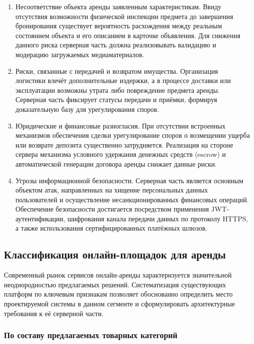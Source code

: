\begin{enumerate}
    \item Несоответствие объекта аренды заявленным характеристикам. Ввиду отсутствия возможности физической инспекции предмета до завершения бронирования существует вероятность расхождения между реальным состоянием объекта и его описанием в карточке объявления. Для снижения данного риска серверная часть должна реализовывать валидацию и модерацию загружаемых медиаматериалов.
    \item Риски, связанные с передачей и возвратом имущества. Организация логистики влечёт дополнительные издержки, а в процессе доставки или эксплуатации возможны утрата либо повреждение предмета аренды. Серверная часть фиксирует статусы передачи и приёмки, формируя доказательную базу для урегулирования споров.
    \item Юридические и финансовые разногласия. При отсутствии встроенных механизмов обеспечения сделки урегулирование споров о возмещении ущерба или возврате депозита существенно затрудняется. Реализация на стороне сервера механизма условного удержания денежных средств (escrow) и автоматической генерации договора аренды снижает данные риски.
    \item Угрозы информационной безопасности. Серверная часть является основным объектом атак, направленных на хищение персональных данных пользователей и осуществление несанкционированных финансовых операций. Обеспечение безопасности достигается посредством применения JWT-аутентификации, шифрования канала передачи данных по протоколу HTTPS, а также использования сертифицированных платёжных шлюзов.
\end{enumerate}
 
\subsection{Классификация онлайн-площадок для аренды}
 
Современный рынок сервисов онлайн-аренды характеризуется значительной неоднородностью предлагаемых решений. Систематизация существующих платформ по ключевым признакам позволяет обоснованно определить место проектируемой системы в данном сегменте и сформулировать архитектурные требования к её серверной части.
 
\subsubsection{По составу предлагаемых товарных категорий}
 

